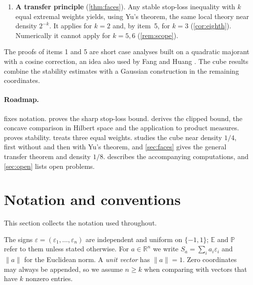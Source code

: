 \documentclass[11pt,a4paper]{article}
\numberwithin{equation}{section}
\theoremstyle{remark}
\newcommand{\E}{\mathbb E}
\newcommand{\PP}{\mathbb P}
\newcommand{\R}{\mathbb R}
\begin{document}
\begin{enumerate}[leftmargin=2em]
 Using Yu's theorem: an exact formula for $W$ near $1/4$ with three real
 parameters, nonattainment in finite dimension, and the expansion through
 the $h^2$ term. Above $1/4$ the added mass is split between two
 neighbouring faces in the ratio $\lambda_*:(1-\lambda_*)$ with
 $\lambda_*=0.97875\ldots$.
\item \textbf{A transfer principle} (\cref{thm:faces}). Any stable stop-loss
 inequality with $k$ equal extremal weights yields, using Yu's theorem,
 the same local theory near density $2^{-k}$. It applies for $k=2$ and, by
 item~5, for $k=3$ (\cref{cor:eighth}). Numerically it cannot apply for
 $k=5,6$ (\cref{rem:scope}).
\end{enumerate}
The proofs of items 1 and 5 are short case analyses built on a quadratic
majorant with a cosine correction, an idea also used by Fang and Huang
\cite{FangHuang}. The cube results combine the stability estimates with a
Gaussian construction in the remaining coordinates.

\paragraph{Roadmap.}
 fixes notation.  proves the sharp
stop-loss bound.  derives the clipped bound, the
concave comparison in Hilbert space and the application to product
measures.  proves stability.  treats
three equal weights.  studies the cube near density $1/4$,
first without and then with Yu's theorem, and \cref{sec:faces} gives the
general transfer theorem and density $1/8$. 
describes the accompanying computations, and \cref{sec:open} lists open
problems.

\section{Notation and conventions}\label{sec:notation}

This section collects the notation used throughout.

The signs $\varepsilon=(\varepsilon_1,\ldots,\varepsilon_n)$ are independent
and uniform on $\{-1,1\}$; $\E$ and $\PP$ refer to them unless stated
otherwise. For $a\in\R^n$ we write $S_a=\sum_ia_i\varepsilon_i$ and
$\|a\|$ for the Euclidean norm. A \emph{unit vector} has $\|a\|=1$.
Zero coordinates may always be appended, so we assume $n\ge k$ when
comparing with vectors that have $k$ nonzero entries.
\end{document}
